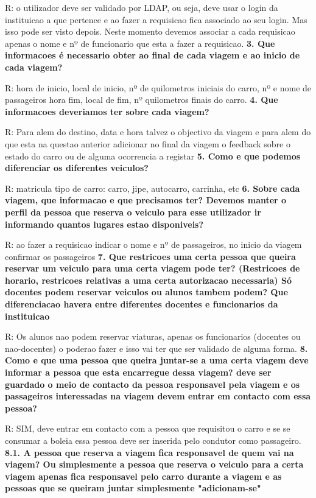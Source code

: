 \documentclass[11pt,a4paper]{report}%
\begin{document}
R: o utilizador deve ser validado por LDAP, ou seja, deve usar o login da instituicao a que pertence e ao fazer a requisicao fica associado ao seu login.
Mas isso pode ser visto depois. Neste momento devemos associar a cada requisicao apenas o nome e nº de funcionario que esta a fazer a requisicao.
\newline
\textbf{3. Que informacoes é necessario obter ao final de cada viagem e ao inicio de cada viagem?}

R: hora de inicio, local de inicio, nº de quilometros iniciais do carro, nº e nome de passageiros hora fim, local de fim, nº quilometros finais do carro.
\newline
\textbf{4. Que informacoes deveriamos ter sobre cada viagem?}

R: Para alem do destino, data e hora talvez o objectivo da viagem e para alem do que esta na questao anterior adicionar no final da viagem o feedback sobre o estado do carro ou de alguma ocorrencia a registar
\newline
\textbf{5. Como e que podemos diferenciar os diferentes veiculos?}

R: matricula
tipo de carro: carro, jipe, autocarro, carrinha, etc
\newline
\textbf{6. Sobre cada viagem, que informacao e que precisamos ter?  Devemos manter o perfil da pessoa que reserva o veiculo para esse utilizador ir informando quantos lugares estao disponiveis?}

R: ao fazer a requisicao indicar o nome e nº de passageiros, no inicio da viagem confirmar os passageiros
\newline
\textbf{7. Que restricoes uma certa pessoa que queira reservar um veiculo para uma certa viagem pode ter? (Restricoes de horario, restricoes relativas a uma certa autorizacao necessaria) Só docentes podem reservar veiculos ou alunos tambem podem? Que diferenciacao havera entre diferentes docentes e funcionarios da instituicao}

R: Os alunos nao podem reservar viaturas, apenas os funcionarios (docentes ou nao-docentes) o poderao fazer e isso vai ter que ser validado de alguma forma.
\newline
\textbf{8. Como e que uma pessoa que queira juntar-se a uma certa viagem deve informar a pessoa que esta encarregue dessa viagem? deve ser guardado o meio de contacto da pessoa responsavel pela viagem e os passageiros interessadas na viagem devem entrar em contacto com essa pessoa?}

R: SIM, deve entrar em contacto com a pessoa que requisitou o carro e se se consumar a boleia essa pessoa deve ser inserida pelo condutor como passageiro.
\newline
\textbf{8.1. A pessoa que reserva a viagem fica responsavel de quem vai na viagem? Ou simplesmente a pessoa que reserva o veiculo para a certa viagem apenas fica responsavel pelo carro durante a viagem e as pessoas que se queiram juntar simplesmente "adicionam-se"}
\end{document}
